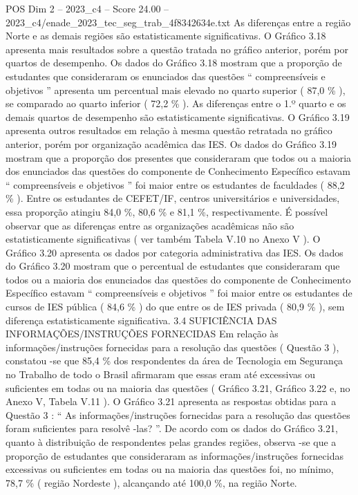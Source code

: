 \begin{textsample}{POS Dim 2 – 2023\_c4 – Score 24.00 – 2023\_c4/enade\_2023\_tec\_seg\_trab\_4f8342634e.txt}
As diferenças entre a região Norte e as demais regiões são estatisticamente significativas.
O Gráfico 3.18 apresenta mais resultados sobre a questão tratada no gráfico anterior, porém por quartos de desempenho.
Os dados do Gráfico 3.18 mostram que a proporção de estudantes que consideraram os enunciados das questões “ compreensíveis e objetivos ” apresenta um percentual mais elevado no quarto superior ( 87,0 \% ), se comparado ao quarto inferior ( 72,2 \% ).
As diferenças entre o 1.º quarto e os demais quartos de desempenho são estatisticamente significativas.
O Gráfico 3.19 apresenta outros resultados em relação à mesma questão retratada no gráfico anterior, porém por organização acadêmica das IES.
Os dados do Gráfico 3.19 mostram que a proporção dos presentes que consideraram que todos ou a maioria dos enunciados das questões do componente de Conhecimento Específico estavam “ compreensíveis e objetivos ” foi maior entre os estudantes de faculdades ( 88,2 \% ).
Entre os estudantes de CEFET/IF, centros universitários e universidades, essa proporção atingiu 84,0 \%, 80,6 \% e 81,1 \%, respectivamente.
É possível observar que as diferenças entre as organizações acadêmicas não são estatisticamente significativas ( ver também Tabela V.10 no Anexo V ).
O Gráfico 3.20 apresenta os dados por categoria administrativa das IES.
Os dados do Gráfico 3.20 mostram que o percentual de estudantes que consideraram que todos ou a maioria dos enunciados das questões do componente de Conhecimento Específico estavam “ compreensíveis e objetivos ” foi maior entre os estudantes de cursos de IES pública ( 84,6 \% ) do que entre os de IES privada ( 80,9 \% ), sem diferença estatisticamente significativa. 3.4 SUFICIÊNCIA DAS INFORMAÇÕES/INSTRUÇÕES FORNECIDAS Em relação às informações/instruções fornecidas para a resolução das questões ( Questão 3 ), constatou -se que 85,4 \% dos respondentes da área de Tecnologia em Segurança no Trabalho de todo o Brasil afirmaram que essas eram até excessivas ou suficientes em todas ou na maioria das questões ( Gráfico 3.21, Gráfico 3.22 e, no Anexo V, Tabela V.11 ).
O Gráfico 3.21 apresenta as respostas obtidas para a Questão 3 : “ As informações/instruções fornecidas para a resolução das questões foram suficientes para resolvê -las? ”.
De acordo com os dados do Gráfico 3.21, quanto à distribuição de respondentes pelas grandes regiões, observa -se que a proporção de estudantes que consideraram as informações/instruções fornecidas excessivas ou suficientes em todas ou na maioria das questões foi, no mínimo, 78,7 \% ( região Nordeste ), alcançando até 100,0 \%, na região Norte.

\end{textsample}

